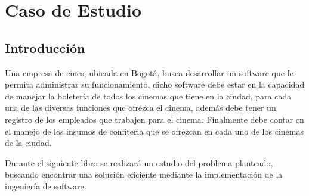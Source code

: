 \chapter{Caso de Estudio}
\section{Introducción}

Una empresa de cines, ubicada en Bogotá, busca desarrollar un software que le permita administrar su funcionamiento, dicho software debe estar en la capacidad de manejar la boletería de todos los cinemas que tiene en la ciudad, para cada una de las diversas funciones que ofrezca el cinema, además debe tener un registro de los empleados que trabajen para el cinema. Finalmente debe contar cn el manejo de los insumos de confiteria que se ofrezcan en cada uno de los cinemas de la ciudad.

Durante el siguiente libro se realizará un estudio del problema planteado, buscando encontrar una solución eficiente mediante la implementación de la ingeniería de software.